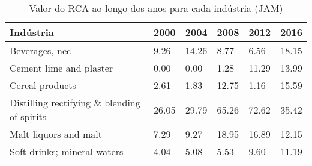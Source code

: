 \begin{table}
\centering
\caption{Valor do RCA ao longo dos anos para cada indústria (JAM)}
\label{tab:ex3-tempo-JAM}
\begin{tabular}{p{6cm}p{1.5cm}p{1.5cm}p{1.5cm}p{1.5cm}p{1.5cm}}
\toprule
                                  Indústria &  2000 &  2004 &  2008 &  2012 &  2016 \\
\midrule
                             Beverages, nec &  9.26 & 14.26 &  8.77 &  6.56 & 18.15 \\
                    Cement lime and plaster &  0.00 &  0.00 &  1.28 & 11.29 & 13.99 \\
                            Cereal products &  2.61 &  1.83 & 12.75 &  1.16 & 15.59 \\
Distilling rectifying \& blending of spirits & 26.05 & 29.79 & 65.26 & 72.62 & 35.42 \\
                      Malt liquors and malt &  7.29 &  9.27 & 18.95 & 16.89 & 12.15 \\
                Soft drinks; mineral waters &  4.04 &  5.08 &  5.53 &  9.60 & 11.19 \\
\bottomrule
\end{tabular}
\end{table}
